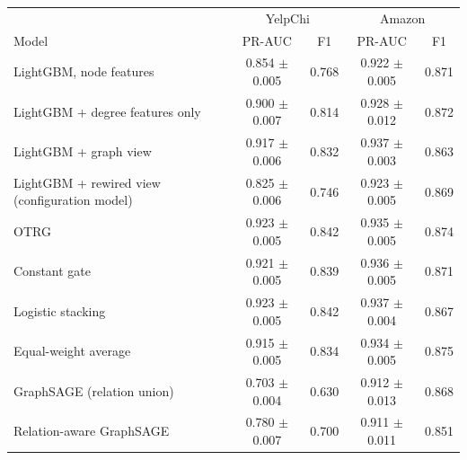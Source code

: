 \begin{tabular}{lcccc}
\toprule
& \multicolumn{2}{c}{YelpChi} & \multicolumn{2}{c}{Amazon} \\
Model & PR-AUC & F1 & PR-AUC & F1 \\
\midrule
LightGBM, node features & 0.854 $\pm$ 0.005 & 0.768 & 0.922 $\pm$ 0.005 & 0.871 \\
LightGBM + degree features only & 0.900 $\pm$ 0.007 & 0.814 & 0.928 $\pm$ 0.012 & 0.872 \\
LightGBM + graph view & 0.917 $\pm$ 0.006 & 0.832 & 0.937 $\pm$ 0.003 & 0.863 \\
LightGBM + rewired view (configuration model) & 0.825 $\pm$ 0.006 & 0.746 & 0.923 $\pm$ 0.005 & 0.869 \\
OTRG & 0.923 $\pm$ 0.005 & 0.842 & 0.935 $\pm$ 0.005 & 0.874 \\
Constant gate & 0.921 $\pm$ 0.005 & 0.839 & 0.936 $\pm$ 0.005 & 0.871 \\
Logistic stacking & 0.923 $\pm$ 0.005 & 0.842 & 0.937 $\pm$ 0.004 & 0.867 \\
Equal-weight average & 0.915 $\pm$ 0.005 & 0.834 & 0.934 $\pm$ 0.005 & 0.875 \\
GraphSAGE (relation union) & 0.703 $\pm$ 0.004 & 0.630 & 0.912 $\pm$ 0.013 & 0.868 \\
Relation-aware GraphSAGE & 0.780 $\pm$ 0.007 & 0.700 & 0.911 $\pm$ 0.011 & 0.851 \\
\bottomrule
\end{tabular}

